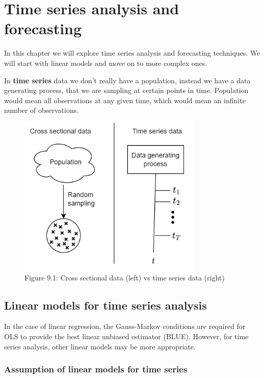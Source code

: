 \chapter{Time series analysis and forecasting}

In this chapter we will explore time series analysis and forecasting techniques. We will start with linear models and move on to more complex ones.

In \textbf{time series} data we don't really have a population, instead we have a data generating process, that we are sampling at certain points in time. Population would mean all observations at any given time, which would mean an infinite number of observations.


\begin{figure}[htbp]
    \begin{center}
        \includegraphics[width=250pt]{../img/09-time-series.png}
        \caption{Figure 9.1:  Cross sectional data (left) vs time series data (right)}
    \end{center}
\end{figure}


\section{Linear models for time series analysis}

In the case of linear regression, the Gauss-Markov conditions are required for OLS to provide the best linear unbiased estimator (BLUE). However, for time series analysis, other linear models may be more appropriate.

\subsection{Assumption of linear models for time series}

